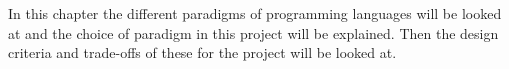 In this chapter the different paradigms of programming languages will be looked at and the choice of paradigm in this project will be explained. Then the design criteria and trade-offs of these for the project will be looked at.